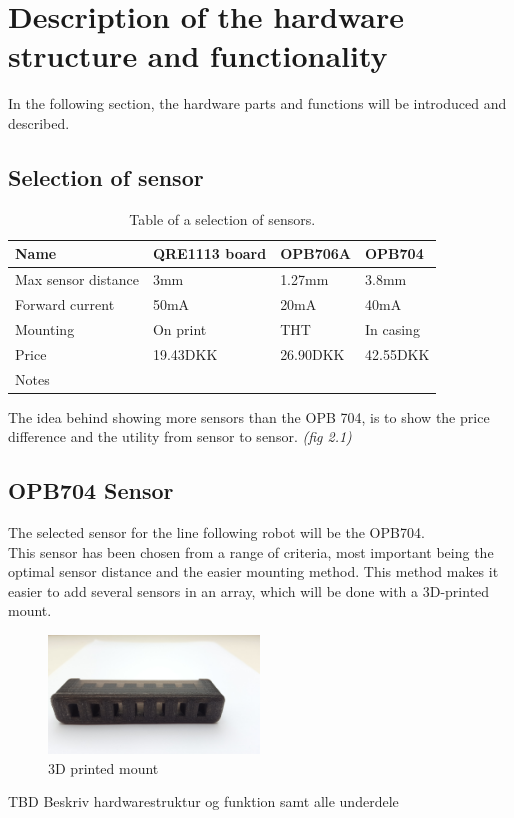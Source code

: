 \section{Description of the hardware structure and functionality}
In the following section, the hardware parts and functions will be introduced and described.
\subsection{Selection of sensor}

\begin{table}[htbp]
    \begin{tabular}{|l|l|l|l|}
        \hline
        Name                & QRE1113 board & OPB706A  & OPB704    \\ \hline
        Max sensor distance & 3mm                            & 1.27mm   & 3.8mm     \\ \hline
        Forward current     & 50mA                           & 20mA     & 40mA      \\ \hline
        Mounting            & On print                       & THT      & In casing \\ \hline
        Price               & 19.43DKK                       & 26.90DKK & 42.55DKK  \\ \hline
        Notes               & ~                              & ~        & ~         \\
        \hline
    \end{tabular}
    \caption{Table of a selection of sensors.}
\label{sensor_table}
\end{table}
The idea behind showing more sensors than the OPB 704, is to show the price difference and the utility from sensor to sensor. \emph{(fig 2.1)}



\subsection{OPB704 Sensor}
The selected sensor for the line following robot will be the OPB704.\\
This sensor has been chosen from a range of criteria, most important being the optimal sensor distance and the easier mounting method. This method makes it easier to add several sensors in an array, which will be done with a 3D-printed mount. 

\begin{figure}[h!]
  \centering
  \includegraphics[width=0.5\textwidth]{figures/sensorarray.jpg}
  
  \caption{3D printed mount}
  \label{3D mount}
\end{figure}
TBD Beskriv hardwarestruktur og funktion samt alle underdele


